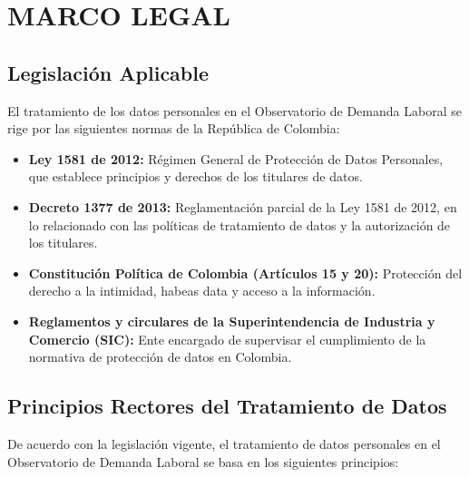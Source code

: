 \documentclass[11pt,oneside,letterpaper]{article}
\begin{document}
\newpage

\section{MARCO LEGAL}

\subsection{Legislación Aplicable}

El tratamiento de los datos personales en el Observatorio de Demanda Laboral se rige por las siguientes normas de la República de Colombia:

\begin{itemize}
    \item \textbf{Ley 1581 de 2012:} Régimen General de Protección de Datos Personales, que establece principios y derechos de los titulares de datos.
    \item \textbf{Decreto 1377 de 2013:} Reglamentación parcial de la Ley 1581 de 2012, en lo relacionado con las políticas de tratamiento de datos y la autorización de los titulares.
    \item \textbf{Constitución Política de Colombia (Artículos 15 y 20):} Protección del derecho a la intimidad, habeas data y acceso a la información.
    \item \textbf{Reglamentos y circulares de la Superintendencia de Industria y Comercio (SIC):} Ente encargado de supervisar el cumplimiento de la normativa de protección de datos en Colombia.
\end{itemize}

\subsection{Principios Rectores del Tratamiento de Datos}

De acuerdo con la legislación vigente, el tratamiento de datos personales en el Observatorio de Demanda Laboral se basa en los siguientes principios:
\end{document}
